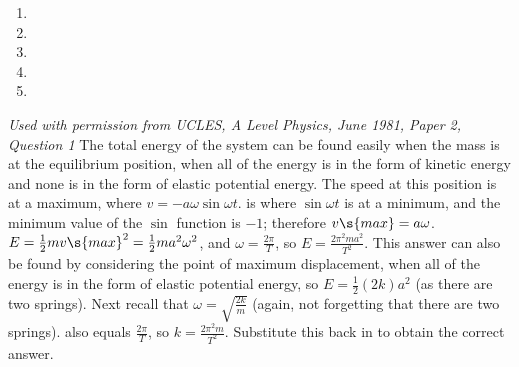 
\begin{problem}[A1981PIIQ16a] %
{ \begin{enumerate}
	\item {}
	\item {}
	\item {}
	\item {}\correct
	\item {}
\end{enumerate}
}
{\textit{Used with permission from UCLES, A Level Physics, June 1981, Paper 2, Question 1}}
{ The total energy of the system can be found easily when the mass is at the equilibrium position, when all of the energy is in the form of kinetic energy and none is in the form of elastic potential energy. The speed at this position is at a maximum, where $v = -a\omega\sin{\omega t}$.  is where $\sin{\omega t}$ is at a minimum, and the minimum value of the $\sin$ function is $-1$; therefore $v\s{max} = a\omega$. $E = \frac{1}{2}mv\s{max}^{2} = \frac{1}{2}ma^{2}\omega^{2}$, and $\omega = \frac{2\pi}{T}$, so $E = \frac{2\pi^{2}ma^{2}}{T^{2}}$. This answer can also be found by considering the point of maximum displacement, when all of the energy is in the form of elastic potential energy, so $E = \frac{1}{2}\left(2k\right)a^2$ (as there are two springs). Next recall that $\omega = \sqrt{\frac{2k}{m}}$ (again, not forgetting that there are two springs). \vari{\omega} also equals $\frac{2\pi}{T}$, so $k = \frac{2\pi^2m}{T^2}$. Substitute this back in to obtain the correct answer.
}
\end{problem}